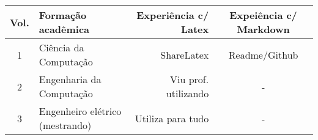 \begin{longtable}[]{@{}clrc@{}}
\toprule
Vol. & Formação acadêmica & Experiência c/ Latex & Expeiência c/ Markdown\tabularnewline
\midrule
\endhead
1 & Ciência da Computação & ShareLatex & Readme/Github\tabularnewline
2 & Engenharia da Computação & Viu prof. utilizando & -\tabularnewline
3 & Engenheiro elétrico (mestrando) & Utiliza para tudo & -\tabularnewline
\bottomrule
\end{longtable}
